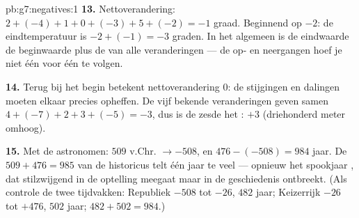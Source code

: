 \begin{solution}{pb:g7:negatives:1}
\textbf{13.} Nettoverandering:
$2 + (-4) + 1 + 0 + (-3) + 5 + (-2) = -1$ graad. Beginnend op $-2$: de
eindtemperatuur is $-2 + (-1) = -3$ graden. In het algemeen is de eindwaarde de
beginwaarde plus de  van alle veranderingen --- de op- en neergangen hoef je
niet één voor één te volgen.

\textbf{14.} Terug bij het begin betekent nettoverandering $0$: de stijgingen en
dalingen moeten elkaar precies opheffen. De vijf bekende veranderingen geven samen
$4 + (-7) + 2 + 3 + (-5) = -3$, dus is de zesde het : $+3$
(driehonderd meter omhoog).

\textbf{15.} Met de astronomen: $509$ v.Chr. $\to -508$, en
$476 - (-508) = 984$ jaar. De $509 + 476 = 985$ van de historicus telt één jaar te
veel --- opnieuw het spookjaar , dat stilzwijgend in de optelling meegaat maar
in de geschiedenis ontbreekt. (Als controle de twee tijdvakken: Republiek $-508$
tot $-26$, $482$ jaar; Keizerrijk $-26$ tot $+476$, $502$ jaar;
$482 + 502 = 984$.)
\end{solution}
